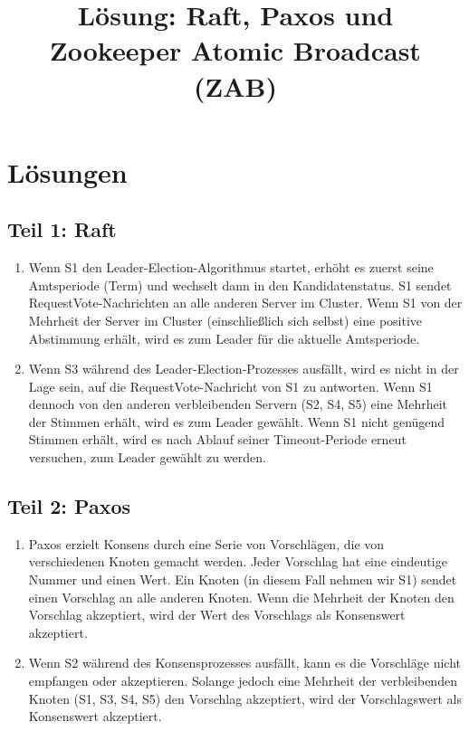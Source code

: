 \documentclass{article}
\begin{document}
\title{Lösung: Raft, Paxos und Zookeeper Atomic Broadcast (ZAB)}
\maketitle

\section*{Lösungen}

\subsection*{Teil 1: Raft}

\begin{enumerate}
\item Wenn S1 den Leader-Election-Algorithmus startet, erhöht es zuerst seine Amtsperiode (Term) und wechselt dann in den Kandidatenstatus. S1 sendet RequestVote-Nachrichten an alle anderen Server im Cluster. Wenn S1 von der Mehrheit der Server im Cluster (einschließlich sich selbst) eine positive Abstimmung erhält, wird es zum Leader für die aktuelle Amtsperiode.

\item Wenn S3 während des Leader-Election-Prozesses ausfällt, wird es nicht in der Lage sein, auf die RequestVote-Nachricht von S1 zu antworten. Wenn S1 dennoch von den anderen verbleibenden Servern (S2, S4, S5) eine Mehrheit der Stimmen erhält, wird es zum Leader gewählt. Wenn S1 nicht genügend Stimmen erhält, wird es nach Ablauf seiner Timeout-Periode erneut versuchen, zum Leader gewählt zu werden.
\end{enumerate}

\subsection*{Teil 2: Paxos}

\begin{enumerate}
\item Paxos erzielt Konsens durch eine Serie von Vorschlägen, die von verschiedenen Knoten gemacht werden. Jeder Vorschlag hat eine eindeutige Nummer und einen Wert. Ein Knoten (in diesem Fall nehmen wir S1) sendet einen Vorschlag an alle anderen Knoten. Wenn die Mehrheit der Knoten den Vorschlag akzeptiert, wird der Wert des Vorschlags als Konsenswert akzeptiert.

\item Wenn S2 während des Konsensprozesses ausfällt, kann es die Vorschläge nicht empfangen oder akzeptieren. Solange jedoch eine Mehrheit der verbleibenden Knoten (S1, S3, S4, S5) den Vorschlag akzeptiert, wird der Vorschlagswert als Konsenswert akzeptiert.
\end{enumerate}
\end{document}
